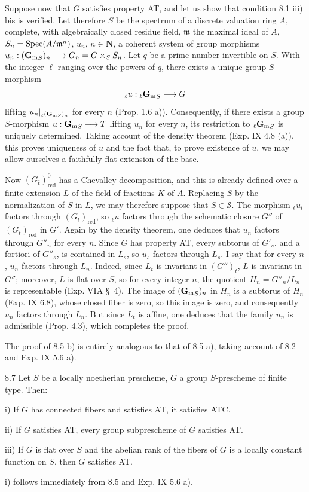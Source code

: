 Suppose now that $G$ satisfies property AT, and let us show that condition 8.1 iii) bis is verified. Let therefore $S$ be the spectrum of a discrete valuation ring $A$, complete, with algebraically closed residue field, $\mathfrak m$ the maximal ideal of $A$, $S_n=\operatorname{Spec}(A/\mathfrak m^n)$, $u_n$, $n\in\mathbf N$, a coherent system of group morphisms $u_n:({\mathbf{G}_{\mathrm{m}}}_S)_n\longrightarrow G_n=G\times_S S_n$. Let $q$ be a prime number invertible on $S$. With the integer $\ell$ ranging over the powers of $q$, there exists a unique group $S$-morphism
\[
{}_\ell u:{}_\ell{\mathbf{G}_{\mathrm{m}}}_S\longrightarrow G
\]
lifting $u_n|_{{}_\ell({\mathbf{G}_{\mathrm{m}}}_S)_n}$ for every $n$ (Prop. 1.6 a)). Consequently, if there exists a group $S$-morphism $u:{\mathbf{G}_{\mathrm{m}}}_S\longrightarrow T$ lifting $u_n$ for every $n$, its restriction to ${}_\ell{\mathbf{G}_{\mathrm{m}}}_S$ is uniquely determined. Taking account of the density theorem (Exp. IX 4.8 (a)), this proves uniqueness of $u$ and the fact that, to prove existence of $u$, we may allow ourselves a faithfully flat extension of the base.

Now $(G_{\bar t})^0_{\mathrm{red}}$ has a Chevalley decomposition, and this is already defined over a finite extension $L$ of the field of fractions $K$ of $A$. Replacing $S$ by the normalization of $S$ in $L$, we may therefore suppose that $S\in\mathscr S$. The morphism ${}_\ell u_t$ factors through $(G_t)_{\mathrm{red}}$, so ${}_\ell u$ factors through the schematic closure $G''$ of $(G_t)_{\mathrm{red}}$ in $G'$. Again by the density theorem, one deduces that $u_n$ factors through $G''_n$ for every $n$. Since $G$ has property AT, every subtorus of $G'_s$, and a fortiori of $G''_s$, is contained in $L_s$, so $u_s$ factors through $L_s$. I say that for every $n$, $u_n$ factors through $L_n$. Indeed, since $L_t$ is invariant in $(G'')_t$, $L$ is invariant in $G''$; moreover, $L$ is flat over $S$, so for every integer $n$, the quotient $H_n=G''_n/L_n$ is representable (Exp. VIA \S\ 4). The image of $({\mathbf{G}_{\mathrm{m}}}_S)_n$ in $H_n$ is a subtorus of $H_n$ (Exp. IX 6.8), whose closed fiber is zero, so this image is zero, and consequently $u_n$ factors through $L_n$. But since $L_t$ is affine, one deduces that the family $u_n$ is admissible (Prop. 4.3), which completes the proof.

The proof of 8.5 b) is entirely analogous to that of 8.5 a), taking account of 8.2 and Exp. IX 5.6 a).
\begin{proposition}{8.7}\label{XV.8.7}
Let $S$ be a locally noetherian prescheme, $G$ a group $S$-prescheme of finite type. Then:

\noindent i) If $G$ has connected fibers and satisfies AT, it satisfies ATC.

\noindent ii) If $G$ satisfies AT, every group subprescheme of $G$ satisfies AT.

\noindent iii) If $G$ is flat over $S$ and the abelian rank of the fibers of $G$ is a locally constant function on $S$, then $G$ satisfies AT.
\end{proposition}
i) follows immediately from 8.5 and Exp. IX 5.6 a).

